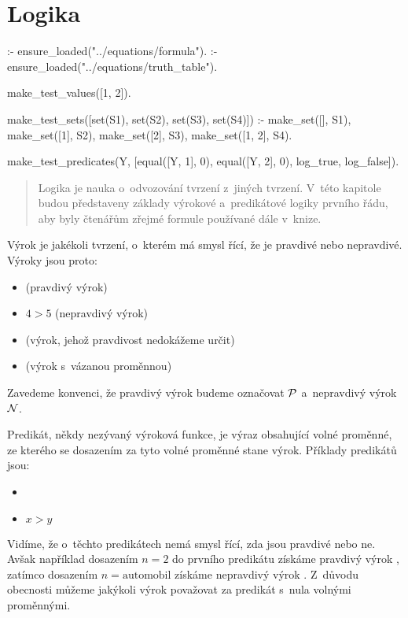 \chapter{Logika}

\begin{prolog}
:- ensure_loaded("../equations/formula").
:- ensure_loaded("../equations/truth_table").

make_test_values([1, 2]).

make_test_sets([set(S1), set(S2), set(S3), set(S4)]) :-
	make_set([], S1),
	make_set([1], S2),
	make_set([2], S3),
	make_set([1, 2], S4).

make_test_predicates(Y, [equal([Y, 1], 0), equal([Y, 2], 0), log_true, log_false]).
\end{prolog}


\begin{abstract}
Logika je nauka o~odvozování tvrzení z~jiných tvrzení. V~této kapitole budou představeny základy výrokové a~predikátové logiky prvního řádu, aby byly čtenářům zřejmé formule používané dále v~knize.
\end{abstract}

Výrok je jakékoli tvrzení, o~kterém má smysl řící, že je pravdivé nebo nepravdivé. Výroky jsou proto:

\begin{itemize}
	\item {} (pravdivý výrok)
	\item \(4 > 5\) (nepravdivý výrok)
	\item {} (výrok, jehož pravdivost nedokážeme určit)
	\item {} (výrok s~vázanou proměnnou)
\end{itemize}

Zavedeme konvenci, že pravdivý výrok budeme označovat \(\mathcal{P}\) a~nepravdivý výrok \(\mathcal{N}\).

Predikát, někdy nezývaný výroková funkce, je výraz obsahující volné proměnné, ze kterého se dosazením za tyto volné proměnné stane výrok. Příklady predikátů jsou:

\begin{itemize}
	\item {}
	\item \(x > y\)
\end{itemize}

Vidíme, že o~těchto predikátech nemá smysl řící, zda jsou pravdivé nebo ne. Avšak například dosazením \(n = 2\) do prvního predikátu získáme pravdivý výrok , zatímco dosazením \(n = \mathrm{automobil}\) získáme nepravdivý výrok . Z~důvodu obecnosti můžeme jakýkoli výrok považovat za predikát s~nula volnými proměnnými.

